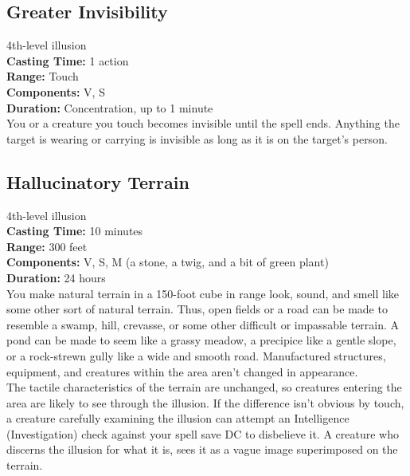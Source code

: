 \documentclass[11pt, A4paper, english]{article}
\begin{document}
		\subsection{Greater Invisibility}
4th-level illusion \\
\textbf{Casting Time:} 1 action \\
\textbf{Range:} Touch \\
\textbf{Components:} V, S \\
\textbf{Duration:} Concentration, up to 1 minute \\
You or a creature you touch becomes invisible until the spell ends. Anything the target is wearing or carrying is invisible as long as it is on the target’s person.

		\subsection{Hallucinatory Terrain}
4th-level illusion \\
\textbf{Casting Time:} 10 minutes \\
\textbf{Range:} 300 feet \\
\textbf{Components:} V, S, M (a stone, a twig, and a bit of green plant) \\
\textbf{Duration:} 24 hours \\
You make natural terrain in a 150-foot cube in range look, sound, and smell like some other sort of natural terrain. Thus, open fields or a road can be made to resemble a swamp, hill, crevasse, or some other difficult or impassable terrain. A pond can be made to seem like a grassy meadow, a precipice like a gentle slope, or a rock-strewn gully like a wide and smooth road. Manufactured structures, equipment, and creatures within the area aren’t changed in appearance. \\
The tactile characteristics of the terrain are unchanged, so creatures entering the area are likely to see through the illusion. If the difference isn’t obvious by touch, a creature carefully examining the illusion can attempt an Intelligence (Investigation) check against your spell save DC to disbelieve it. A creature who discerns the illusion for what it is, sees it as a vague image superimposed on the terrain.
\end{document}
